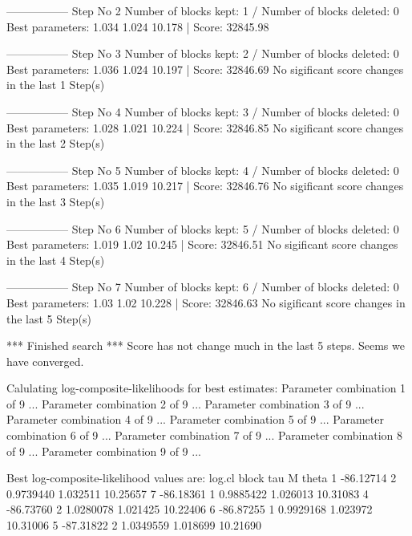\begin{Schunk}
\begin{Soutput}
----------------- 
Step No 2 
Number of blocks kept: 1  / Number of blocks deleted: 0 
Best parameters:  1.034 1.024 10.178 | Score: 32845.98 

----------------- 
Step No 3 
Number of blocks kept: 2  / Number of blocks deleted: 0 
Best parameters:  1.036 1.024 10.197 | Score: 32846.69 
No sigificant score changes in the last 1 Step(s) 

----------------- 
Step No 4 
Number of blocks kept: 3  / Number of blocks deleted: 0 
Best parameters:  1.028 1.021 10.224 | Score: 32846.85 
No sigificant score changes in the last 2 Step(s) 

----------------- 
Step No 5 
Number of blocks kept: 4  / Number of blocks deleted: 0 
Best parameters:  1.035 1.019 10.217 | Score: 32846.76 
No sigificant score changes in the last 3 Step(s) 

----------------- 
Step No 6 
Number of blocks kept: 5  / Number of blocks deleted: 0 
Best parameters:  1.019 1.02 10.245 | Score: 32846.51 
No sigificant score changes in the last 4 Step(s) 

----------------- 
Step No 7 
Number of blocks kept: 6  / Number of blocks deleted: 0 
Best parameters:  1.03 1.02 10.228 | Score: 32846.63 
No sigificant score changes in the last 5 Step(s) 

*** Finished search *** 
Score has not change much in the last 5 steps. 
Seems we have converged. 

Calulating log-composite-likelihoods for best estimates: 
Parameter combination 1 of 9 ... 
Parameter combination 2 of 9 ... 
Parameter combination 3 of 9 ... 
Parameter combination 4 of 9 ... 
Parameter combination 5 of 9 ... 
Parameter combination 6 of 9 ... 
Parameter combination 7 of 9 ... 
Parameter combination 8 of 9 ... 
Parameter combination 9 of 9 ... 


Best log-composite-likelihood values are: 
     log.cl block       tau        M    theta
1 -86.12714     2 0.9739440 1.032511 10.25657
7 -86.18361     1 0.9885422 1.026013 10.31083
4 -86.73760     2 1.0280078 1.021425 10.22406
6 -86.87255     1 0.9929168 1.023972 10.31006
5 -87.31822     2 1.0349559 1.018699 10.21690
\end{Soutput}
\end{Schunk}

